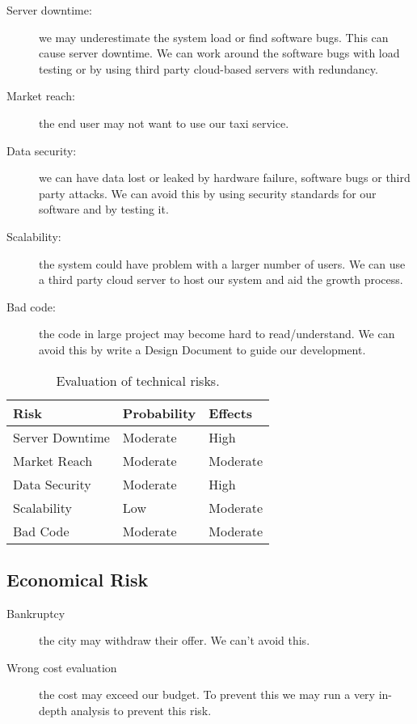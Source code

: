     \begin{description}
      \item[Server downtime:] we may underestimate the system load or find
          software bugs. This can cause server downtime. We can work around
          the software bugs with load testing or by using third party cloud-based servers with redundancy.
      \item[Market reach:] the end user may not want to use our taxi service. 
      \item[Data security:] we can have data lost or leaked by hardware failure,
          software bugs or third party attacks. We can avoid
          this by using security standards for our software and by testing it.
      \item[Scalability:] the system could have problem with a larger number of users. We can use a third party cloud server
          to host our system and aid the growth process.
      \item[Bad code:] the code in large project may become hard to read/understand. We can avoid this by
          write a Design Document to guide our development.
    \end{description}

    \begin{table}[h]
      \centering
          \begin{tabular}{| l | l | l |}
              \hline
              \textbf{Risk} & \textbf{Probability}  & \textbf{Effects}  \\
              \hline
              Server Downtime & Moderate & High\\
              \hline
              Market Reach & Moderate & Moderate\\
              \hline
              Data Security & Moderate & High\\
              \hline
              Scalability & Low & Moderate          \\
              \hline
              Bad Code & Moderate & Moderate\\
              \hline
          \end{tabular}
        \caption{Evaluation of technical risks.}
    \end{table}
  \subsection{Economical Risk}
  \askpippo
    \begin{description}
      \item[Bankruptcy] the city may withdraw their offer. We can't avoid this.
      \item[Wrong cost evaluation] the cost may exceed our budget. To prevent this we may run a very in-depth analysis to prevent this risk.
    \end{description}


